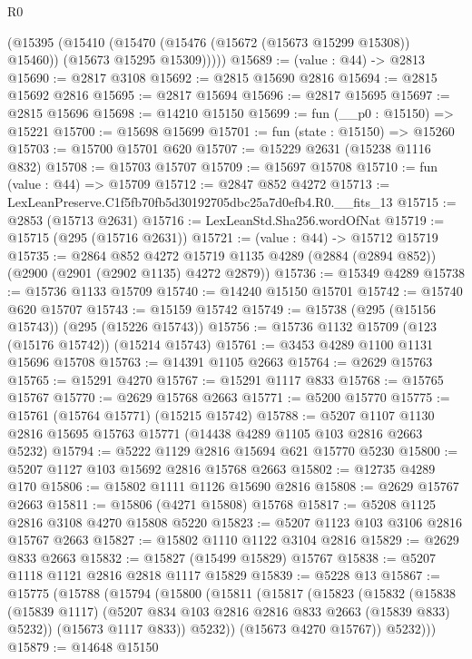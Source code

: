 \begin{lexlean}{R0}
\begin{coremodule}
        (@15395
          (@15410
            (@15470 (@15476 (@15672 (@15673 @15299 @15308)) @15460))
            (@15673 @15295 @15309)))))
@15689 := (value : @44) -> @2813
@15690 := @2817 @3108
@15692 := @2815 @15690 @2816
@15694 := @2815 @15692 @2816
@15695 := @2817 @15694
@15696 := @2817 @15695
@15697 := @2815 @15696
@15698 := @14210 @15150
@15699 := fun (__p0 : @15150) => @15221
@15700 := @15698 @15699
@15701 := fun (state : @15150) => @15260
@15703 := @15700 @15701 @620
@15707 := @15229 @2631 (@15238 @1116 @832)
@15708 := @15703 @15707
@15709 := @15697 @15708
@15710 := fun (value : @44) => @15709
@15712 := @2847 @852 @4272
@15713 := LexLeanPreserve.C1f5fb70fb5d30192705dbc25a7d0efb4.R0.__fits_13
@15715 := @2853 (@15713 @2631)
@15716 := LexLeanStd.Sha256.wordOfNat
@15719 := @15715 (@295 (@15716 @2631))
@15721 := (value : @44) -> @15712 @15719
@15735 := @2864
    @852
    @4272
    @15719
    @1135
    @4289
    (@2884 (@2894 @852))
    (@2900 (@2901 (@2902 @1135) @4272 @2879))
@15736 := @15349 @4289
@15738 := @15736 @1133 @15709
@15740 := @14240 @15150 @15701
@15742 := @15740 @620 @15707
@15743 := @15159 @15742
@15749 := @15738 (@295 (@15156 @15743)) (@295 (@15226 @15743))
@15756 := @15736 @1132 @15709 (@123 (@15176 @15742)) (@15214 @15743)
@15761 := @3453 @4289 @1100 @1131 @15696 @15708
@15763 := @14391 @1105 @2663
@15764 := @2629 @15763
@15765 := @15291 @4270
@15767 := @15291 @1117 @833
@15768 := @15765 @15767
@15770 := @2629 @15768 @2663
@15771 := @5200 @15770
@15775 := @15761 (@15764 @15771) (@15215 @15742)
@15788 := @5207 @1107 @1130 @2816 @15695 @15763 @15771 (@14438 @4289 @1105 @103 @2816 @2663 @5232)
@15794 := @5222 @1129 @2816 @15694 @621 @15770 @5230
@15800 := @5207 @1127 @103 @15692 @2816 @15768 @2663
@15802 := @12735 @4289 @170
@15806 := @15802 @1111 @1126 @15690 @2816
@15808 := @2629 @15767 @2663
@15811 := @15806 (@4271 @15808) @15768
@15817 := @5208 @1125 @2816 @3108 @4270 @15808 @5220
@15823 := @5207 @1123 @103 @3106 @2816 @15767 @2663
@15827 := @15802 @1110 @1122 @3104 @2816
@15829 := @2629 @833 @2663
@15832 := @15827 (@15499 @15829) @15767
@15838 := @5207 @1118 @1121 @2816 @2818 @1117 @15829
@15839 := @5228 @13
@15867 := @15775
    (@15788
      (@15794
        (@15800
          (@15811
            (@15817
              (@15823
                (@15832
                  (@15838
                    (@15839 @1117)
                    (@5207 @834 @103 @2816 @2816 @833 @2663 (@15839 @833) @5232))
                  (@15673 @1117 @833))
                @5232))
            (@15673 @4270 @15767))
          @5232)))
@15879 := @14648
    @15150

\end{coremodule}
\end{lexlean}
